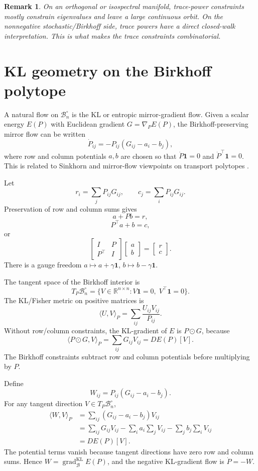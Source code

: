 \documentclass[11pt]{article}
\newtheorem{remark}{Remark}
\newcommand{\B}{\mathcal B}
\newcommand{\one}{\mathbf 1}
\newcommand{\grad}{\operatorname{grad}}
\newcommand{\R}{\mathbb R}
\begin{document}
\begin{remark}
On an orthogonal or isospectral manifold, trace-power constraints mostly constrain eigenvalues and leave a large continuous orbit. On the nonnegative stochastic/Birkhoff side, trace powers have a direct closed-walk interpretation. This is what makes the trace constraints combinatorial.
\end{remark}

\section{KL geometry on the Birkhoff polytope}

A natural flow on $\B_n^\circ$ is the KL or entropic mirror-gradient flow. Given a scalar energy $E(P)$ with Euclidean gradient $G=\nabla_P E(P)$, the Birkhoff-preserving mirror flow can be written
\[
    \dot P_{ij}=-P_{ij}(G_{ij}-a_i-b_j),
\]
where row and column potentials $a,b$ are chosen so that $\dot P\one=0$ and $\dot P^\top\one=0$. This is related to Sinkhorn and mirror-flow viewpoints on transport polytopes \citep{karimi2023sinkhorn,ballu2023mirror,nutz2021introduction}.

Let
\[
    r_i=\sum_jP_{ij}G_{ij},\qquad c_j=\sum_iP_{ij}G_{ij}.
\]
Preservation of row and column sums gives
\[
    a+Pb=r,
\]
\[
    P^\top a+b=c,
\]
or
\[
\begin{bmatrix} I&P\\ P^\top&I\end{bmatrix}
\begin{bmatrix} a\\ b\end{bmatrix}
=
\begin{bmatrix} r\\ c\end{bmatrix}.
\]
There is a gauge freedom $a\mapsto a+\gamma\one$, $b\mapsto b-\gamma\one$.

The tangent space of the Birkhoff interior is
\[
    T_P\B_n^\circ=\{V\in\R^{n\times n}:V\one=0,\;V^\top\one=0\}.
\]
The KL/Fisher metric on positive matrices is
\[
    \langle U,V\rangle_P=\sum_{ij}\frac{U_{ij}V_{ij}}{P_{ij}}.
\]
Without row/column constraints, the KL-gradient of $E$ is $P\odot G$, because
\[
    \langle P\odot G,V\rangle_P=\sum_{ij}G_{ij}V_{ij}=DE(P)[V].
\]
The Birkhoff constraints subtract row and column potentials before multiplying by $P$.

Define
\[
    W_{ij}=P_{ij}(G_{ij}-a_i-b_j).
\]
For any tangent direction $V\in T_P\B_n^\circ$,
\begin{align*}
    \langle W,V\rangle_P
    &=\sum_{ij}(G_{ij}-a_i-b_j)V_{ij}\\
    &=\sum_{ij}G_{ij}V_{ij}
      -\sum_i a_i\sum_jV_{ij}
      -\sum_j b_j\sum_iV_{ij}\\
    &=DE(P)[V].
\end{align*}
The potential terms vanish because tangent directions have zero row and column sums. Hence $W=\grad^{\mathrm{KL}}_{\B}E(P)$, and the negative KL-gradient flow is $\dot P=-W$.
\end{document}

